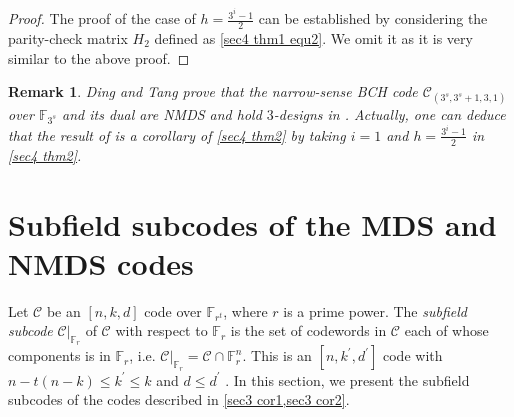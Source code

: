 \documentclass[sn-mathphys-num]{sn-jnl}%
\theoremstyle{thmstyleone}%
\theoremstyle{thmstyletwo}%
\newtheorem{remark}{Remark}%
\theoremstyle{thmstylethree}%
\begin{document}
\begin{proof}
	The proof of the case of $h=\frac{3^i-1}{2}$ can be established by considering the parity-check matrix $H_2$ defined as \cref{sec4 thm1 equ2}. We omit it as it is very similar to the above proof.
\end{proof}

\begin{remark}\label{sec4 rmk1}
	Ding and Tang prove that the narrow-sense BCH code $\mathcal{C}_{(3^s,3^s+1,3,1)}$ over $\mathbb{F}_{3^s}$ and its dual are NMDS and hold $3$-designs in \cite[Theorem 21]{Ding2020InfiniteFamiliesMDS}. Actually, one can deduce that the result of \cite[Theorem 21]{Ding2020InfiniteFamiliesMDS} is a corollary of \cref{sec4 thm2} by taking $i=1$ and $h=\frac{3^i-1}{2}$ in \cref{sec4 thm2}.
\end{remark}


\section{Subfield subcodes of the MDS and NMDS codes}

Let $\mathcal{C}$ be an $[n,k,d]$ code over $\mathbb{F}_{r^t}$, where $r$ is a prime power. The {\it subfield subcode} $\mathcal{C}|_{\mathbb{F}_r}$ of $\mathcal{C}$ with respect to $\mathbb{F}_r$ is the set of codewords in $\mathcal{C}$ each of whose components is in $\mathbb{F}_r$, i.e. $\mathcal{C}|_{\mathbb{F}_r}=\mathcal{C}\cap\mathbb{F}_r^n$. This is an $[n,k^\prime,d^\prime]$ code with $n-t(n-k)\le k^\prime\le k$ and $d\le d^\prime$ \cite{Delsarte1975SubfieldSubcodesModified}. In this section, we present the subfield subcodes of the codes described in \cref{sec3 cor1,sec3 cor2}.
\end{document}
